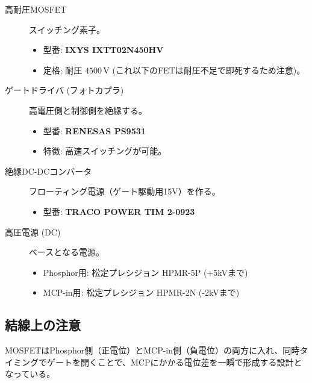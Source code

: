 \begin{description}
    \item[高耐圧MOSFET] スイッチング素子。
    \begin{itemize}
        \item 型番: \textbf{IXYS IXTT02N450HV}
        \item 定格: 耐圧 $4500\,\mathrm{V}$ (これ以下のFETは耐圧不足で即死するため注意)。
    \end{itemize}
    
    \item[ゲートドライバ (フォトカプラ)] 高電圧側と制御側を絶縁する。
    \begin{itemize}
        \item 型番: \textbf{RENESAS PS9531}
        \item 特徴: 高速スイッチングが可能。
    \end{itemize}
    
    \item[絶縁DC-DCコンバータ] フローティング電源（ゲート駆動用15V）を作る。
    \begin{itemize}
        \item 型番: \textbf{TRACO POWER TIM 2-0923}
    \end{itemize}
    
    \item[高圧電源 (DC)] ベースとなる電源。
    \begin{itemize}
        \item Phosphor用: 松定プレシジョン HPMR-5P (+5kVまで)
        \item MCP-in用: 松定プレシジョン HPMR-2N (-2kVまで)
    \end{itemize}
\end{description}

\subsection{結線上の注意}
MOSFETはPhosphor側（正電位）とMCP-in側（負電位）の両方に入れ、同時タイミングでゲートを開くことで、MCPにかかる電位差を一瞬で形成する設計となっている。